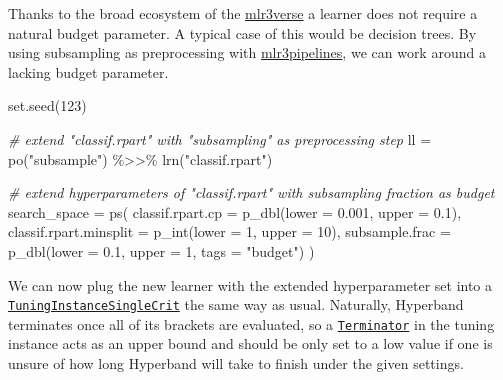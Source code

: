 \documentclass[
]{scrbook}
\newenvironment{Shaded}{\begin{snugshade}}{\end{snugshade}}
\newcommand{\AttributeTok}[1]{\textcolor[rgb]{0.77,0.63,0.00}{#1}}
\newcommand{\CommentTok}[1]{\textcolor[rgb]{0.56,0.35,0.01}{\textit{#1}}}
\newcommand{\DecValTok}[1]{\textcolor[rgb]{0.00,0.00,0.81}{#1}}
\newcommand{\FloatTok}[1]{\textcolor[rgb]{0.00,0.00,0.81}{#1}}
\newcommand{\FunctionTok}[1]{\textcolor[rgb]{0.00,0.00,0.00}{#1}}
\newcommand{\NormalTok}[1]{#1}
\newcommand{\OtherTok}[1]{\textcolor[rgb]{0.56,0.35,0.01}{#1}}
\newcommand{\SpecialCharTok}[1]{\textcolor[rgb]{0.00,0.00,0.00}{#1}}
\newcommand{\StringTok}[1]{\textcolor[rgb]{0.31,0.60,0.02}{#1}}
\renewenvironment{Shaded} {\begin{snugshade}\small} {\end{snugshade}}
\begin{document}
Thanks to the broad ecosystem of the \href{https://mlr3verse.mlr-org.com}{mlr3verse} a learner does not require a natural budget parameter.
A typical case of this would be decision trees.
By using subsampling as preprocessing with \href{https://mlr3pipelines.mlr-org.com}{mlr3pipelines}, we can work around a lacking budget parameter.

\begin{Shaded}
\begin{Highlighting}[]
\FunctionTok{set.seed}\NormalTok{(}\DecValTok{123}\NormalTok{)}

\CommentTok{\# extend "classif.rpart" with "subsampling" as preprocessing step}
\NormalTok{ll }\OtherTok{=} \FunctionTok{po}\NormalTok{(}\StringTok{"subsample"}\NormalTok{) }\SpecialCharTok{\%\textgreater{}\textgreater{}\%} \FunctionTok{lrn}\NormalTok{(}\StringTok{"classif.rpart"}\NormalTok{)}

\CommentTok{\# extend hyperparameters of "classif.rpart" with subsampling fraction as budget}
\NormalTok{search\_space }\OtherTok{=} \FunctionTok{ps}\NormalTok{(}
  \AttributeTok{classif.rpart.cp =} \FunctionTok{p\_dbl}\NormalTok{(}\AttributeTok{lower =} \FloatTok{0.001}\NormalTok{, }\AttributeTok{upper =} \FloatTok{0.1}\NormalTok{),}
  \AttributeTok{classif.rpart.minsplit =} \FunctionTok{p\_int}\NormalTok{(}\AttributeTok{lower =} \DecValTok{1}\NormalTok{, }\AttributeTok{upper =} \DecValTok{10}\NormalTok{),}
  \AttributeTok{subsample.frac =} \FunctionTok{p\_dbl}\NormalTok{(}\AttributeTok{lower =} \FloatTok{0.1}\NormalTok{, }\AttributeTok{upper =} \DecValTok{1}\NormalTok{, }\AttributeTok{tags =} \StringTok{"budget"}\NormalTok{)}
\NormalTok{)}
\end{Highlighting}
\end{Shaded}

We can now plug the new learner with the extended hyperparameter set into a \href{https://mlr3tuning.mlr-org.com/reference/TuningInstanceSingleCrit.html}{\texttt{TuningInstanceSingleCrit}} the same way as usual.
Naturally, Hyperband terminates once all of its brackets are evaluated, so a \href{https://bbotk.mlr-org.com/reference/Terminator.html}{\texttt{Terminator}} in the tuning instance acts as an upper bound and should be only set to a low value if one is unsure of how long Hyperband will take to finish under the given settings.

\begin{Shaded}
\end{Shaded}
\end{document}

